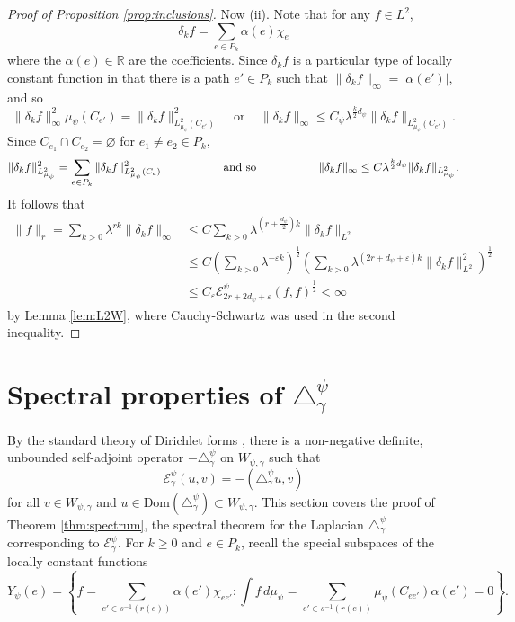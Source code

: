 \documentclass[12pt]{amsart}
\theoremstyle{plain}
\theoremstyle{definition}
\begin{document}
\begin{proof}[Proof of Proposition \ref{prop:inclusions}]
    Now (ii). Note that for any $f\in L^2$,
    $$\delta_k f = \sum_{e\in P_k} \alpha(e) \chi_e$$
    where the $\alpha(e)\in\mathbb{R}$ are the coefficients. Since $\delta_k f$ is a particular type of locally constant function in that there is a path $e'\in P_k$ such that $\|\delta_kf \|_\infty = |\alpha(e')|$, and so
    $$\|\delta_k f\|_\infty^2\mu_\psi(C_{e'}) = \|\delta_k f\|_{L^2_{\mu_\psi}(C_{e'})}^2 \;\;\; \mbox{ or }  \;\;\;\|\delta_k f\|_\infty \leq C_\psi \lambda^{\frac{k}{2}d_\psi}\|\delta_k f\|_{L^2_{\mu_\psi}(C_{e'})}.$$
    Since $C_{e_1}\cap C_{e_2} = \varnothing$ for $e_1\neq e_2\in P_k$, 
    $$\|\delta_k f\|_{L^2_{\mu_\psi}}^2 = \sum_{e\in P_k}\|\delta_k f\|_{L^2_{\mu_{\psi}}(C_e)}^2 \hspace{.7in}\mbox{  and so  } \hspace{.7in}\|\delta_k f\|_\infty \leq C \lambda^{\frac{k}{2}d_\psi}\|\delta_k f\|_{L^2_{\mu_\psi}}.$$
    It follows that
    \begin{align*}
    \|f\|_r = \sum_{k> 0} \lambda^{rk} \|\delta_k f\|_\infty &\leq C\sum_{k>0} \lambda^{\left(r+\frac{d_\psi}{2}\right)k}\|\delta_k f \|_{L^2} \\ 
    &\leq C\left( \sum_{k>0}\lambda^{-\varepsilon k}\right) ^\frac12 \left(\sum_{k>0} \lambda^{\left(2r+d_\psi +\varepsilon \right)k}\|\delta_k f \|_{L^2}^2 \right)^\frac12 \\
    &\leq C_\varepsilon \mathcal{E}^\psi _{2r + 2d_\psi + \varepsilon}(f,f)^\frac12 < \infty
    \end{align*}
    by Lemma \ref{lem:L2W}, where Cauchy-Schwartz was used in the second inequality.
\end{proof}

\section{Spectral properties of $\triangle_\gamma^\psi$}
\label{sec:spectral}
By the standard theory of Dirichlet forms \cite{FOT:DF}, there is a non-negative definite, unbounded self-adjoint operator $-\triangle_\gamma^\psi$ on $W_{\psi,\gamma}$ such that
$$\mathcal{E}^\psi _\gamma(u,v) = -(\triangle_\gamma^\psi u, v)$$
for all $v\in W_{\psi,\gamma}$ and $u\in \mathrm{Dom}(\triangle_\gamma^{\psi})\subset W_{\psi,\gamma} $. This section covers the proof of Theorem \ref{thm:spectrum}, the spectral theorem for the  Laplacian $\triangle^\psi_\gamma$ corresponding to $\mathcal{E}^\psi_\gamma $. For $k\geq 0$ and $e\in P_k$, recall the special subspaces of the locally constant functions
$$Y_\psi(e) = \left\{ f=\sum_{e'\in s^{-1}(r(e))} \alpha(e')\chi_{ee'}: \int f\, d\mu_\psi = \sum_{e'\in s^{-1}(r(e))} \mu_\psi(C_{ee'})\alpha(e') = 0\right\}.$$
\end{document}
